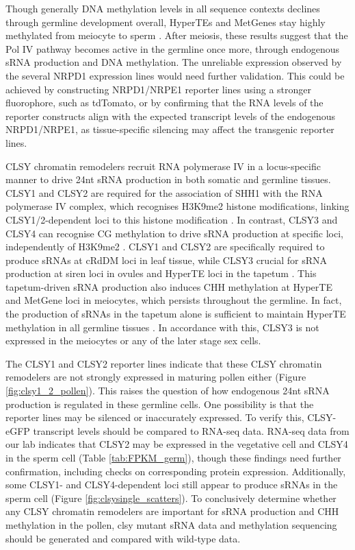 Though generally DNA methylation levels in all sequence contexts declines through germline development overall, HyperTEs and MetGenes stay highly methylated from meiocyte to sperm \citep{RN17,RN199}. After meiosis, these results suggest that the Pol IV pathway becomes active in the germline once more, through endogenous sRNA production and DNA methylation.  The unreliable expression observed by the several NRPD1 expression lines would need further validation. This could be achieved by constructing NRPD1/NRPE1 reporter lines using a stronger fluorophore, such as tdTomato, or by confirming that the RNA levels of the reporter constructs align with the expected transcript levels of the endogenous NRPD1/NRPE1, as tissue-specific silencing may affect the transgenic reporter lines.

CLSY chromatin remodelers recruit RNA polymerase IV in a locus-specific manner to drive 24nt sRNA production in both somatic and germline tissues. CLSY1 and CLSY2 are required for the association of SHH1 with the RNA polymerase IV complex, which recognises H3K9me2 histone modifications, linking CLSY1/2-dependent loci to this histone modification \citep{RN23}. In contrast, CLSY3 and CLSY4 can recognise CG methylation to drive sRNA production at specific loci, independently of H3K9me2 \citep{RN23}. CLSY1 and CLSY2 are specifically required to produce sRNAs at cRdDM loci in leaf tissue, while CLSY3 crucial for sRNA production at siren loci in ovules and HyperTE loci in the tapetum \citep{RN162,RN23,RN187}. This tapetum-driven sRNA production also induces CHH methylation at HyperTE and MetGene loci in meiocytes, which persists throughout the germline. In fact, the production of sRNAs in the tapetum alone is sufficient to maintain HyperTE methylation in all germline tissues \citep{RN187}. In accordance with this, CLSY3 is not expressed in the meiocytes or any of the later stage sex cells. 

The CLSY1 and CLSY2 reporter lines indicate that these CLSY chromatin remodelers are not strongly expressed in maturing pollen either (Figure \ref{fig:clsy1_2_pollen}). This raises the question of how endogenous 24nt sRNA production is regulated in these germline cells. One possibility is that the reporter lines may be silenced or inaccurately expressed. To verify this, CLSY-eGFP transcript levels should be compared to RNA-seq data. RNA-seq data from our lab indicates that CLSY2 may be expressed in the vegetative cell and CLSY4 in the sperm cell (Table \ref{tab:FPKM_germ}), though these findings need further confirmation, including checks on corresponding protein expression. Additionally, some CLSY1- and CLSY4-dependent loci still appear to produce sRNAs in the sperm cell (Figure \ref{fig:clsysingle_scatters}). To conclusively determine whether any CLSY chromatin remodelers are important for sRNA production and CHH methylation in the pollen, clsy mutant sRNA data and methylation sequencing should be generated and compared with wild-type data.

